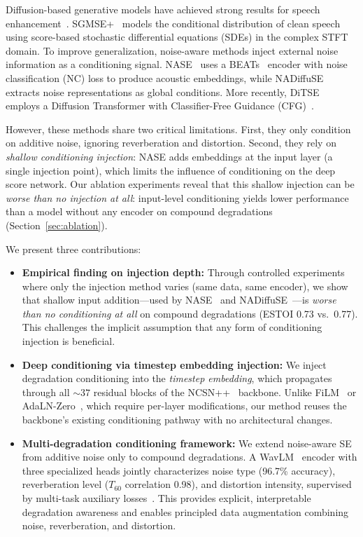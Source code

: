 \documentclass[cameraready]{Interspeech}
\begin{document}
Diffusion-based generative models have achieved strong results for speech enhancement~\cite{richter2023speech, lu2022conditional}.
SGMSE+~\cite{richter2023speech} models the conditional distribution of clean speech using score-based stochastic differential equations (SDEs) in the complex STFT domain.
To improve generalization, noise-aware methods inject external noise information as a conditioning signal.
NASE~\cite{hu2023nase} uses a BEATs~\cite{chen2023beats} encoder with noise classification (NC) loss to produce acoustic embeddings, while NADiffuSE~\cite{wang2023nadiffuse} extracts noise representations as global conditions.
More recently, DiTSE~\cite{zheng2025ditse} employs a Diffusion Transformer with Classifier-Free Guidance (CFG)~\cite{ho2022classifier}.

However, these methods share two critical limitations.
First, they only condition on additive noise, ignoring reverberation and distortion.
Second, they rely on \textit{shallow conditioning injection}: NASE adds embeddings at the input layer (a single injection point), which limits the influence of conditioning on the deep score network.
Our ablation experiments reveal that this shallow injection can be \textit{worse than no injection at all}: input-level conditioning yields lower performance than a model without any encoder on compound degradations (Section~\ref{sec:ablation}).

We present three contributions:
\begin{itemize}
\item \textbf{Empirical finding on injection depth:} Through controlled experiments where only the injection method varies (same data, same encoder), we show that shallow input addition---used by NASE~\cite{hu2023nase} and NADiffuSE~\cite{wang2023nadiffuse}---is \textit{worse than no conditioning at all} on compound degradations (ESTOI 0.73 vs.\ 0.77).
This challenges the implicit assumption that any form of conditioning injection is beneficial.

\item \textbf{Deep conditioning via timestep embedding injection:} We inject degradation conditioning into the \textit{timestep embedding}, which propagates through all ${\sim}37$ residual blocks of the NCSN++~\cite{song2020score} backbone.
Unlike FiLM~\cite{perez2018film} or AdaLN-Zero~\cite{peebles2023scalable}, which require per-layer modifications, our method reuses the backbone's existing conditioning pathway with no architectural changes.

\item \textbf{Multi-degradation conditioning framework:} We extend noise-aware SE from additive noise only to compound degradations.
A WavLM~\cite{chen2022wavlm} encoder with three specialized heads jointly characterizes noise type (96.7\% accuracy), reverberation level ($T_{60}$ correlation 0.98), and distortion intensity, supervised by multi-task auxiliary losses~\cite{caruana1997multitask}.
This provides explicit, interpretable degradation awareness and enables principled data augmentation combining noise, reverberation, and distortion.
\end{itemize}
\end{document}
